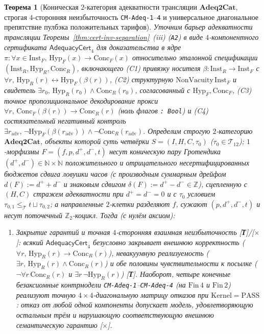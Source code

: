 \documentclass[11pt]{article}
\theoremstyle{plain}
\newtheorem{theorem}{Теорема}[section]
\theoremstyle{definition}
\begin{document}
\begin{theorem}[Коническая $2$-категория адекватности трансляции $\mathbf{Adeq2Cat}$, строгая $4$-сторонняя неизбыточность \texttt{CM-Adeq-1}--\texttt{4} и универсальное диагональное препятствие пулбэка положительных тарифов]\label{thm:adeq2cat-and-cm-adeq}
Уточним барьер адекватности трансляции Теоремы~\ref{thm:cert-inv-separation}~(iii) (\texttt{A2}) в виде $4$-компонентного сертификата $\mathsf{AdequacyCert}_4$ для доказательства в ядре $\pi : \forall x \in \mathrm{Inst}_F,\, \mathrm{Hyp}_F(x) \to \mathrm{Conc}_F(x)$ относительно эталонной спецификации $(\mathrm{Inst}_R, \mathrm{Hyp}_R, \mathrm{Conc}_R)$, включающего \textup{(C1)} привязку носителя $\beta : \mathrm{Inst}_R \to \mathrm{Inst}_F$ с $\forall r,\, \mathrm{Hyp}_R(r) \leftrightarrow \mathrm{Hyp}_F(\beta(r))$, \textup{(C2)} структурную $\mathrm{NonVacuity}\,\mathrm{Inst}_F$ и свидетель $\exists r_0,\, \mathrm{Hyp}_R(r_0) \wedge \mathrm{Conc}_R(r_0)$, согласованный с $\mathrm{Hyp}_F, \mathrm{Conc}_F$, \textup{(C3)} точное пропозициональное декодирование прокси $\forall r,\, \mathrm{Conc}_F(\beta(r)) \to \mathrm{Conc}_R(r)$ (ноль флагов \texttt{: Bool}) и \textup{(C4)} состязательный негативный контроль $\exists r_{\mathrm{adv}},\, \neg\mathrm{Hyp}_F(\beta(r_{\mathrm{adv}})) \wedge \neg\mathrm{Conc}_R(r_{\mathrm{adv}})$. Определим строгую $2$-категорию $\mathbf{Adeq2Cat}$, объекты которой суть четвёрки $S = (I, H, C, \tau_0)$ ($\tau_0 \in \mathcal{T}_{12}$); $1$-морфизмы $F = (f, p, d^+, d^-, t)$ несут \emph{коническую пару Гротендика} $(d^+, d^-) \in \mathbb{N} \times \mathbb{N}$ положительного и отрицательного несертифицированных бюджетов сдвига ловушки часов (с производным суммарным дрейфом $d(F) := d^+ + d^-$ и знаковым сдвигом $\delta(F) := d^+ - d^- \in \mathbb{Z}$), сцепленную с $(H, C)$ стражем адекватности при $d^+ = d^- = 0$ и с $\tau_0$ условием $\tau_{0,1} \le_{\mathcal{T}} t \sqcup \tau_{0,2}$; а направленные $2$-клетки разделяют $f$, сужают $(p, d^+, d^-, t)$ и несут поточечный $\mathbb{Z}_2$-коцикл. Тогда (с нулём аксиом):
\begin{enumerate}[nosep,label=(\roman*)]
\item \emph{Закрытие гарантий и точная $4$-сторонняя взаимная неизбыточность \textup{[\textbf{Т}]}/\textup{[\textbf{$\times$}]}}: всякий $\mathsf{AdequacyCert}_4$ безусловно закрывает внешнюю корректность ($\forall r,\, \mathrm{Hyp}_R(r) \to \mathrm{Conc}_R(r)$), невакуумную реализуемость ($\exists r,\, \mathrm{Hyp}_R(r) \wedge \mathrm{Conc}_R(r)$) и обе половины чувствительности к посылке ($\neg\forall r\,\mathrm{Conc}_R(r)$ и $\exists r\,\neg\mathrm{Hyp}_R(r)$) \textup{[\textbf{Т}]}. Наоборот, четыре конечные безаксиомные контрмодели \texttt{CM-Adeq-1}--\texttt{CM-Adeq-4} (на $\mathrm{Fin}\,4$ и $\mathrm{Fin}\,2$) реализуют точную $4 \times 4$-диагональную матрицу отказов при $\mathrm{Kernel} = \mathrm{PASS}$: отказ от любой одной компоненты допускает модель, удовлетворяющую остальным трём и нарушающую соответствующую внешнюю семантическую гарантию \textup{[\textbf{$\times$}]}.

\end{enumerate}
\end{theorem}
\end{document}
